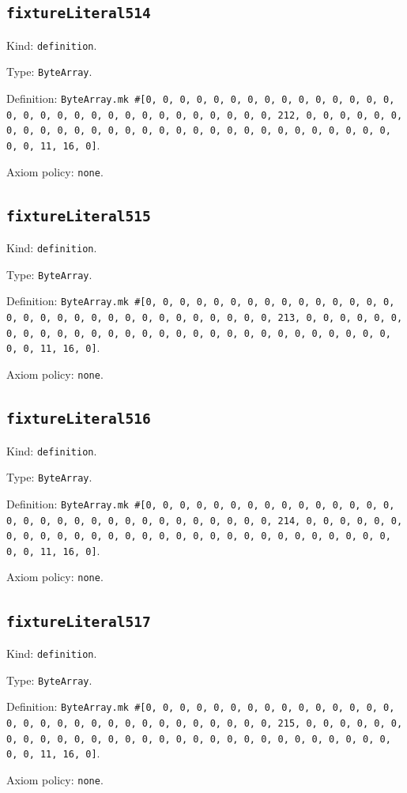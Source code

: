 \documentclass[11pt]{article}
\begin{document}
\subsection*{\texttt{fixtureLiteral514}}
\noindent Kind: \texttt{definition}.\par
\noindent Type: \texttt{ByteArray}.\par
\noindent Definition: \texttt{ByteArray.mk \#[0, 0, 0, 0, 0, 0, 0, 0, 0, 0, 0, 0, 0, 0, 0, 0, 0, 0, 0, 0, 0, 0, 0, 0, 0, 0, 0, 0, 0, 0, 0, 212, 0, 0, 0, 0, 0, 0, 0, 0, 0, 0, 0, 0, 0, 0, 0, 0, 0, 0, 0, 0, 0, 0, 0, 0, 0, 0, 0, 0, 0, 0, 0, 11, 16, 0]}.\par
\noindent Axiom policy: \texttt{none}.\par
\subsection*{\texttt{fixtureLiteral515}}
\noindent Kind: \texttt{definition}.\par
\noindent Type: \texttt{ByteArray}.\par
\noindent Definition: \texttt{ByteArray.mk \#[0, 0, 0, 0, 0, 0, 0, 0, 0, 0, 0, 0, 0, 0, 0, 0, 0, 0, 0, 0, 0, 0, 0, 0, 0, 0, 0, 0, 0, 0, 0, 213, 0, 0, 0, 0, 0, 0, 0, 0, 0, 0, 0, 0, 0, 0, 0, 0, 0, 0, 0, 0, 0, 0, 0, 0, 0, 0, 0, 0, 0, 0, 0, 11, 16, 0]}.\par
\noindent Axiom policy: \texttt{none}.\par
\subsection*{\texttt{fixtureLiteral516}}
\noindent Kind: \texttt{definition}.\par
\noindent Type: \texttt{ByteArray}.\par
\noindent Definition: \texttt{ByteArray.mk \#[0, 0, 0, 0, 0, 0, 0, 0, 0, 0, 0, 0, 0, 0, 0, 0, 0, 0, 0, 0, 0, 0, 0, 0, 0, 0, 0, 0, 0, 0, 0, 214, 0, 0, 0, 0, 0, 0, 0, 0, 0, 0, 0, 0, 0, 0, 0, 0, 0, 0, 0, 0, 0, 0, 0, 0, 0, 0, 0, 0, 0, 0, 0, 11, 16, 0]}.\par
\noindent Axiom policy: \texttt{none}.\par
\subsection*{\texttt{fixtureLiteral517}}
\noindent Kind: \texttt{definition}.\par
\noindent Type: \texttt{ByteArray}.\par
\noindent Definition: \texttt{ByteArray.mk \#[0, 0, 0, 0, 0, 0, 0, 0, 0, 0, 0, 0, 0, 0, 0, 0, 0, 0, 0, 0, 0, 0, 0, 0, 0, 0, 0, 0, 0, 0, 0, 215, 0, 0, 0, 0, 0, 0, 0, 0, 0, 0, 0, 0, 0, 0, 0, 0, 0, 0, 0, 0, 0, 0, 0, 0, 0, 0, 0, 0, 0, 0, 0, 11, 16, 0]}.\par
\noindent Axiom policy: \texttt{none}.\par
\end{document}

